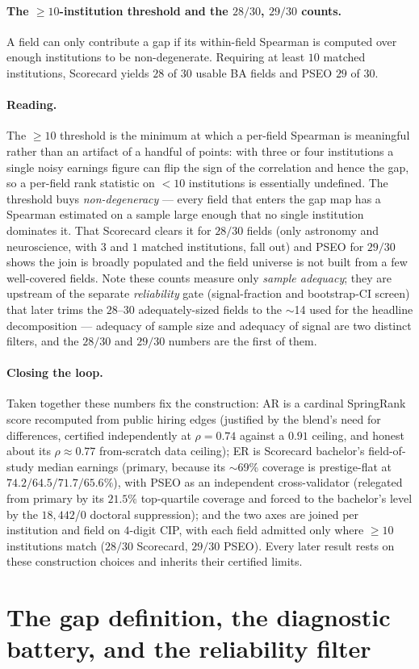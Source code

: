 \documentclass[11pt]{article}
\begin{document}
\paragraph{The $\ge 10$-institution threshold and the $28/30$, $29/30$ counts.} A field can only contribute a gap if its within-field Spearman is computed over enough institutions to be non-degenerate. Requiring at least $10$ matched institutions, Scorecard yields $28$ of $30$ usable BA fields and PSEO $29$ of $30$.
\paragraph{Reading.} The $\ge 10$ threshold is the minimum at which a per-field Spearman is meaningful rather than an artifact of a handful of points: with three or four institutions a single noisy earnings figure can flip the sign of the correlation and hence the gap, so a per-field rank statistic on $<10$ institutions is essentially undefined. The threshold buys \emph{non-degeneracy} --- every field that enters the gap map has a Spearman estimated on a sample large enough that no single institution dominates it. That Scorecard clears it for $28/30$ fields (only astronomy and neuroscience, with $3$ and $1$ matched institutions, fall out) and PSEO for $29/30$ shows the join is broadly populated and the field universe is not built from a few well-covered fields. Note these counts measure only \emph{sample adequacy}; they are upstream of the separate \emph{reliability} gate (signal-fraction and bootstrap-CI screen) that later trims the $28$--$30$ adequately-sized fields to the $\sim$14 used for the headline decomposition --- adequacy of sample size and adequacy of signal are two distinct filters, and the $28/30$ and $29/30$ numbers are the first of them.

\paragraph{Closing the loop.} Taken together these numbers fix the construction: AR is a cardinal SpringRank score recomputed from public hiring edges (justified by the blend's need for differences, certified independently at $\rho=0.74$ against a $0.91$ ceiling, and honest about its $\rho\approx0.77$ from-scratch data ceiling); ER is Scorecard bachelor's field-of-study median earnings (primary, because its $\sim$69\% coverage is prestige-flat at $74.2/64.5/71.7/65.6\%$), with PSEO as an independent cross-validator (relegated from primary by its $21.5\%$ top-quartile coverage and forced to the bachelor's level by the $18{,}442$/$0$ doctoral suppression); and the two axes are joined per institution and field on $4$-digit CIP, with each field admitted only where $\ge 10$ institutions match ($28/30$ Scorecard, $29/30$ PSEO). Every later result rests on these construction choices and inherits their certified limits.\section{The gap definition, the diagnostic battery, and the reliability filter}\label{sec:companion-gap}
\end{document}
